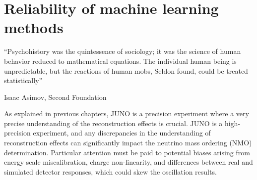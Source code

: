 \documentclass[../main.tex]{subfiles}
\begin{document}
\chapter{Reliability of machine learning methods}
\label{sec:janne}

\epigraph{``Psychohistory was the quintessence of sociology; it was the science of human behavior reduced to mathematical equations. The individual human being is unpredictable, but the reactions of human mobs, Seldon found, could be treated statistically''}{Isaac Asimov, Second Foundation}

\minitoc
%
%
%
%
%
As explained in previous chapters, JUNO is a precision experiment where a very precise understanding of the reconstruction effects is crucial. JUNO is a high-precision experiment, and any discrepancies in the understanding of reconstruction effects can significantly impact the neutrino mass ordering (NMO) determination. Particular attention must be paid to potential biases arising from energy scale miscalibration, charge non-linearity, and differences between real and simulated detector responses, which could skew the oscillation results.
\end{document}
